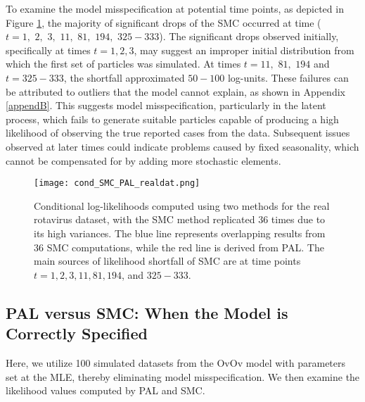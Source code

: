 \documentclass[10pt]{article}
\begin{document}
To examine the model misspecification at potential time points, as depicted in Figure \ref{fig:cond_SMC_PAL_realdat}, the majority of significant drops of the SMC occurred at time ($t=1, \,\,2, \,\,3, \,\,11, \,\,81, \,\,194, \,\,325-333$). The significant drops observed initially, specifically at times $t=1, 2, 3$, may suggest an improper initial distribution from which the first set of particles was simulated. At times $t=11, \,\,81, \,\,194$ and $t=325-333$, the shortfall approximated $50-100$ log-units. These failures can be attributed to outliers that the model cannot explain, as shown in Appendix \ref{appendB}. This suggests model misspecification, particularly in the latent process, which fails to generate suitable particles capable of producing a high likelihood of observing the true reported cases from the data. Subsequent issues observed at later times could indicate problems caused by fixed seasonality, which cannot be compensated for by adding more stochastic elements. 

\vspace{-4.5mm}
\begin{figure}[H]
\centering
\texttt{[image: cond\_SMC\_PAL\_realdat.png]}
\caption{\label{fig:cond_SMC_PAL_realdat}Conditional log-likelihoods computed using two methods for the real rotavirus dataset, with the SMC method replicated 36 times due to its high variances. The blue line represents overlapping results from 36 SMC computations, while the red line is derived from PAL. The main sources of likelihood shortfall of SMC are at time points $t=1, 2, 3, 11, 81, 194$, and $325-333$.}
\end{figure}

\vspace{-8mm}
\subsection{PAL versus SMC: When the Model is Correctly Specified}\label{section3}

Here, we utilize 100 simulated datasets from the OvOv model with parameters set at the MLE, thereby eliminating model misspecification. We then examine the likelihood values computed by PAL and SMC.
\end{document}
